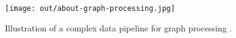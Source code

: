 \begin{figure}[hbtp]
  \centering  %
  \texttt{[image: out/about-graph-processing.jpg]}
  \caption{Illustration of a complex data pipeline for graph processing \cite{graph-sakr21}.}
  \label{fig:about-graph-processing}
\end{figure}

